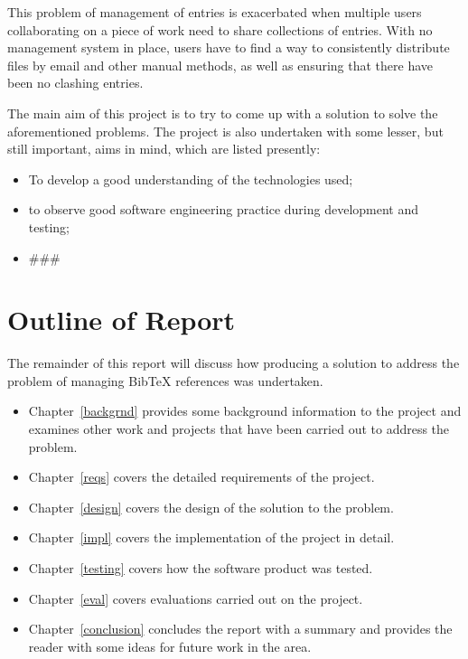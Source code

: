 \documentclass{l4proj}
\newcommand{\BibTeX}{B{\sc ib}\TeX}
\newcommand{\bibtex}{\BibTeX}
\newcommand{\revisit}{\#\#\#}
\begin{document}
This problem of management of entries is exacerbated when multiple users collaborating on a piece of work need to share collections of entries.  With no management system in place, users have to find a way to consistently distribute files by email and other manual methods, as well as ensuring that there have been no clashing entries.

The main aim of this project is to try to come up with a solution to solve the aforementioned problems.  The project is also undertaken with some lesser, but still important, aims in mind, which are listed presently:
\begin{itemize}
\item To develop a good understanding of the technologies used;
\item to observe good software engineering practice during development and testing;
\item \revisit
\end{itemize}


\section{Outline of Report}
The remainder of this report will discuss how producing a solution to address the problem of managing \bibtex{} references was undertaken. 
\begin{itemize}
\item Chapter~\ref{backgrnd} provides some background information to the project and examines other work and projects that have been carried out to address the problem.
\item Chapter~\ref{reqs} covers the detailed requirements of the project.
\item Chapter~\ref{design} covers the design of the solution to the problem.
\item Chapter~\ref{impl} covers the implementation of the project in detail.
\item Chapter~\ref{testing} covers how the software product was tested.
\item Chapter~\ref{eval} covers evaluations carried out on the project.
\item Chapter~\ref{conclusion} concludes the report with a summary and provides the reader with some ideas for future work in the area.
\end{itemize}
\end{document}
